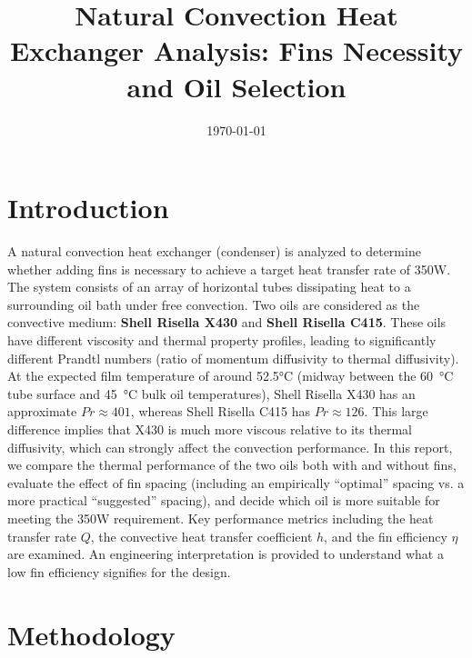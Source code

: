 \documentclass[12pt]{article}
\begin{document}
\tableofcontents
\title{Natural Convection Heat Exchanger Analysis: Fins Necessity and Oil Selection}
\author{}
\date{\today}
\maketitle

\section{Introduction}
A natural convection heat exchanger (condenser) is analyzed to determine whether adding fins is necessary to achieve a target heat transfer rate of 350W. The system consists of an array of horizontal tubes dissipating heat to a surrounding oil bath under free convection. Two oils are considered as the convective medium: \textbf{Shell Risella X430} and \textbf{Shell Risella C415}. These oils have different viscosity and thermal property profiles, leading to significantly different Prandtl numbers (ratio of momentum diffusivity to thermal diffusivity). At the expected film temperature of around 52.5°C (midway between the 60~°C tube surface and 45~°C bulk oil temperatures), Shell Risella X430 has an approximate $\textit{Pr} \approx 401$, whereas Shell Risella C415 has $\textit{Pr} \approx 126$. This large difference implies that X430 is much more viscous relative to its thermal diffusivity, which can strongly affect the convection performance. In this report, we compare the thermal performance of the two oils both with and without fins, evaluate the effect of fin spacing (including an empirically “optimal” spacing vs. a more practical “suggested” spacing), and decide which oil is more suitable for meeting the 350W requirement. Key performance metrics including the heat transfer rate $Q$, the convective heat transfer coefficient $h$, and the fin efficiency $\eta$ are examined. An engineering interpretation is provided to understand what a low fin efficiency signifies for the design.

\section{Methodology}
\end{document}
